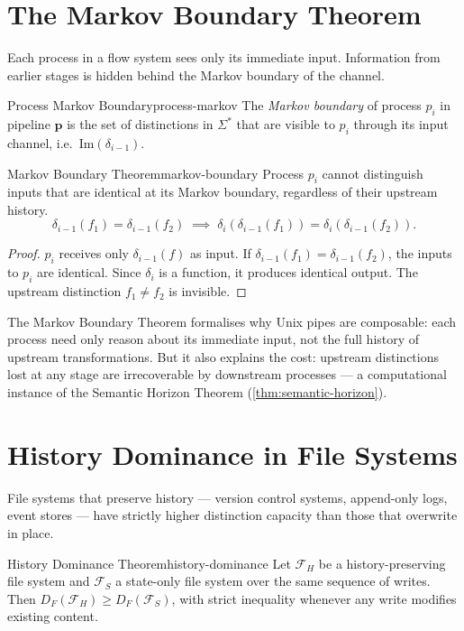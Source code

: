 \documentclass[12pt,twoside,openright]{book}
\newcommand{\csicon} {\marginpar{\tiny\color{DistBlue}\faCode}}
\newcommand{\bioicon}{\marginpar{\tiny\color{DistTeal}\faDna}}
\begin{document}
\section{The Markov Boundary Theorem}

Each process in a flow system sees only its immediate
input. Information from earlier stages is hidden behind
the Markov boundary of the channel.

\begin{definition}{Process Markov Boundary}{process-markov}
  The \emph{Markov boundary} of process $p_i$ in
  pipeline $\mathbf{p}$ is the set of distinctions
  in $\Sigma^*$ that are visible to $p_i$ through its
  input channel, i.e.\ $\mathrm{Im}(\delta_{i-1})$.
\end{definition}

\begin{theorem}{Markov Boundary Theorem}{markov-boundary}
  Process $p_i$ cannot distinguish inputs that are
  identical at its Markov boundary, regardless of their
  upstream history.
  \[
    \delta_{i-1}(f_1) = \delta_{i-1}(f_2)
    \;\implies\;
    \delta_i(\delta_{i-1}(f_1)) = \delta_i(\delta_{i-1}(f_2)).
  \]
\end{theorem}

\begin{proof}
  $p_i$ receives only $\delta_{i-1}(f)$ as input.
  If $\delta_{i-1}(f_1) = \delta_{i-1}(f_2)$, the inputs
  to $p_i$ are identical. Since $\delta_i$ is a function,
  it produces identical output. The upstream distinction
  $f_1 \ne f_2$ is invisible.
\end{proof}

\noindent
The Markov Boundary Theorem formalises why Unix
pipes are composable: each process need only reason about
its immediate input, not the full history of upstream
transformations. But it also explains the cost: upstream
distinctions lost at any stage are irrecoverable by
downstream processes — a computational instance of the
Semantic Horizon Theorem
(\cref{thm:semantic-horizon}).

\section{History Dominance in File Systems}

\bioicon\csicon
File systems that preserve history — version control
systems, append-only logs, event stores — have strictly
higher distinction capacity than those that overwrite
in place.

\begin{theorem}{History Dominance Theorem}{history-dominance}
  Let $\mathcal{F}_H$ be a history-preserving file system
  and $\mathcal{F}_S$ a state-only file system over the
  same sequence of writes.
  Then $D_F(\mathcal{F}_H) \ge D_F(\mathcal{F}_S)$,
  with strict inequality whenever any write modifies
  existing content.
\end{theorem}
\end{document}
